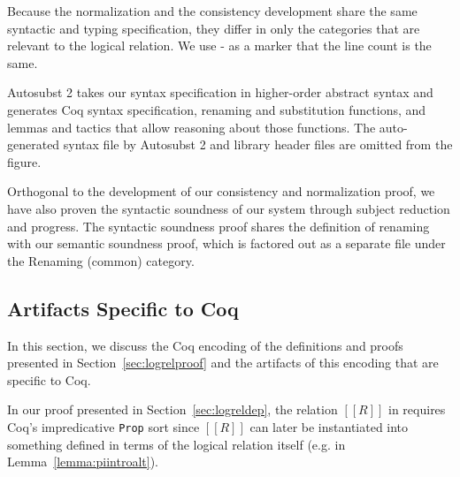 \documentclass[acmsmall,screen=true,
\ifpublic review=false\else,review=true\fi
  ,anonymous=\ifanonymous true\else false\fi]{acmart}
\newcommand{\scw}[1]{}
\newcommand{\yl}[1]{}
\begin{document}
Because the normalization and the consistency development share the same
syntactic and typing specification, they differ in only the categories
that are relevant to the logical relation. We use - as a marker that
the line count is the same.

Autosubst 2 takes our syntax specification in higher-order abstract
syntax and generates Coq syntax specification, renaming and
substitution functions, and lemmas and tactics that allow reasoning
about those functions. The auto-generated syntax file by Autosubst 2
and library header files are omitted from the figure.

Orthogonal to the development of our consistency and normalization
proof, we have also proven the syntactic soundness of our system through subject
reduction and progress. The syntactic soundness proof shares the
definition of renaming with our semantic soundness proof, which is
factored out as a separate file under the Renaming (common) category.
\scw{Should add this line count as another column, for comparison. I've done so,
but may need to update the numbers. }

\subsection{Artifacts Specific to Coq}
In this section, we discuss the Coq encoding of the definitions and proofs presented
in Section~\ref{sec:logrelproof} and the artifacts of this encoding that are
specific to Coq.


In our proof presented in Section~\ref{sec:logreldep}, the relation
$[[R]]$ in  requires Coq's impredicative \texttt{Prop} sort
since $[[R]]$ can later be instantiated into something defined in
terms of the logical relation itself (e.g. in
Lemma~\ref{lemma:piintroalt}). \scw{I'm having trouble connecting the rule in
the figure with rule \texttt{InterpExtFun} in the coq development. Would it make
sense to include the definition of ProdSpace? What is the Coq type of R?}
\yl{I think I might just inline the definition of ProdSpace and then
  rename the variables from the Coq code to match the ones from the paper}
\end{document}
